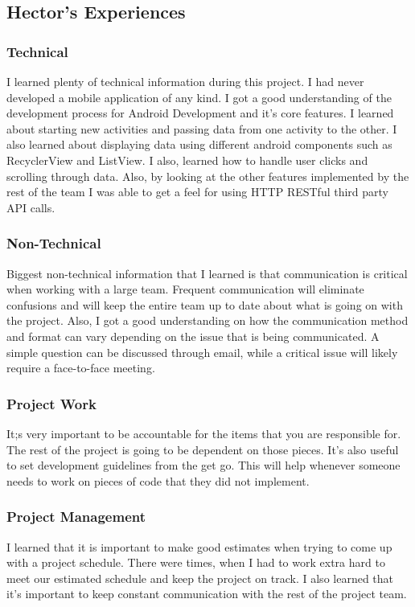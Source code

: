 \documentclass[journal,compsoc, 10pt, draftclsnofoot, onecolumn]{IEEEtran}
\begin{document}
\subsection{Hector's Experiences}
\subsubsection{Technical}
I learned plenty of technical information during this project. I had never 
developed a mobile application of any kind. I got a good understanding of 
the development process for Android Development and it's core features.
 I learned about starting new activities and passing data from one activity 
 to the other. I also learned about displaying data using different android 
 components such as RecyclerView and ListView. I also, learned how to 
 handle user clicks and scrolling through data. Also, by looking at the other 
 features implemented by the rest of the team I was able to get a feel for 
 using HTTP RESTful third party API calls.

\subsubsection{Non-Technical}
Biggest non-technical information that I learned is that communication is 
critical when working with a large team. Frequent communication will eliminate 
confusions and will keep the entire team up to date about what is going on 
with the project. Also, I got a good understanding on how the communication 
method and format can vary depending on the issue that is being 
communicated. A simple question can be discussed through email, while a 
critical issue will likely require a face-to-face meeting.

\subsubsection{Project Work}
It;s very important to be accountable for the items that you are responsible 
for. The rest of the project is going to be dependent on those pieces. It's also 
useful to set development guidelines from the get go. This will help whenever 
someone needs to work on pieces of code that they did not implement. 

\subsubsection{Project Management}
I learned that it is important to make good estimates when trying to come up 
with a project schedule. There were times, when I had to work extra hard to 
meet our estimated schedule and keep the project on track. I also learned that 
it's important to keep constant communication with the rest of the project team.
\end{document}
